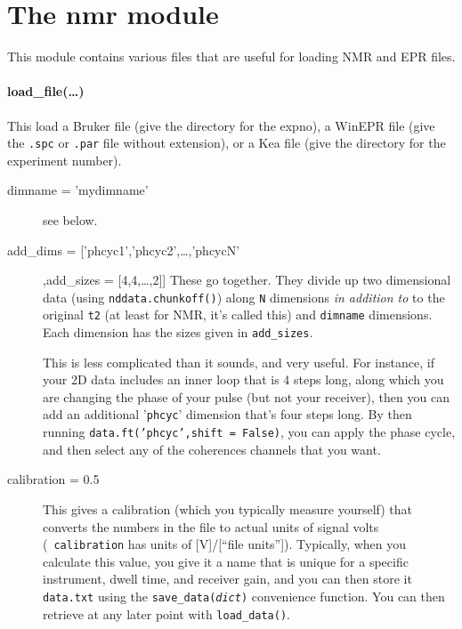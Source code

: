 \section{The nmr module}
This module contains various files that are useful for loading NMR and EPR files.
\paragraph{load\_file(\ldots)}
This load a Bruker file (give the directory for the expno),
    a WinEPR file (give the \texttt{.spc} or \texttt{.par} file without extension),
    or a Kea file (give the directory for the experiment number).

    \begin{mykwargs}
        \begin{description}
            \item[dimname = 'mydimname']
                see below.
                
            \item[add\_dims = ['phcyc1','phcyc2',\ldots,'phcycN'],add\_sizes = [4,4,\ldots,2]]
                These go together.
                They divide up two dimensional data (using \texttt{nddata.chunkoff()})
                    along \texttt{N} dimensions \textit{in addition to}
                    to the original \texttt{t2}
                    (at least for NMR, it's called this)
                    and \texttt{dimname} dimensions.
                Each dimension has the sizes given in \texttt{add\_sizes}.

                This is less complicated than it sounds, and very useful.
                For instance,
                    if your 2D data includes an inner loop that is 4 steps long,
                    along which you are changing the phase of your pulse
                    (but not your receiver),
                    then you can add an additional '\texttt{phcyc}'
                    dimension that's four steps long.
                By then running \texttt{data.ft('phcyc',shift = False)}, 
                    you can apply the phase cycle,
                    and then select any of the coherences channels that you want.
                \item[calibration = 0.5] 
                    This gives a calibration (which you typically measure yourself)
                        that converts the numbers in the file to actual units of signal volts
                        (\ie\ \texttt{calibration} has units of [V]/[``file units'']).
                    Typically, when you calculate this value,
                        you give it a name that is unique for a specific instrument, dwell time, and receiver gain,
                        and you can then store it \texttt{data.txt}
                        using the \texttt{save\_data(\textit{dict})}
                        convenience function.
                    You can then retrieve at any later point with
                        \texttt{load\_data()}.
        \end{description}
    \end{mykwargs}

